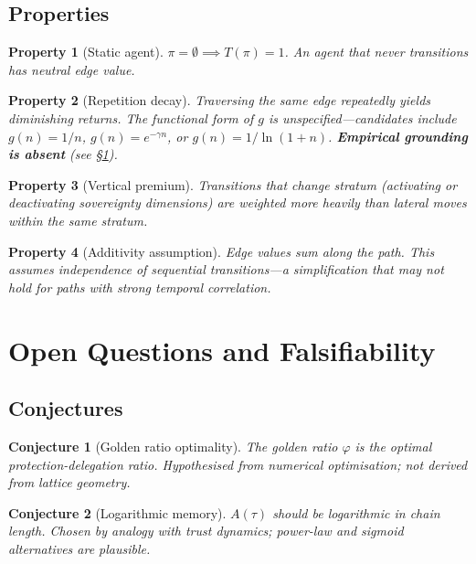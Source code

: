 \documentclass[11pt,a4paper]{article}
\newtheorem{property}{Property}[section]
\newtheorem{conjecture}{Conjecture}[section]
\begin{document}
\subsection{Properties}

\begin{property}[Static agent]
$\pi = \emptyset \implies T(\pi) = 1$. An agent that never transitions has neutral edge value.
\end{property}

\begin{property}[Repetition decay]
Traversing the same edge repeatedly yields diminishing returns. The functional form of $g$ is unspecified---candidates include $g(n) = 1/n$, $g(n) = e^{-\gamma n}$, or $g(n) = 1/\ln(1+n)$. \textbf{Empirical grounding is absent} (see \S\ref{sec:open}).
\end{property}

\begin{property}[Vertical premium]
Transitions that change stratum (activating or deactivating sovereignty dimensions) are weighted more heavily than lateral moves within the same stratum.
\end{property}

\begin{property}[Additivity assumption]
Edge values sum along the path. This assumes independence of sequential transitions---a simplification that may not hold for paths with strong temporal correlation.
\end{property}

\section{Open Questions and Falsifiability}
\label{sec:open}

\subsection{Conjectures}

\begin{conjecture}[Golden ratio optimality]\label{conj:phi}
The golden ratio $\varphi$ is the optimal protection-delegation ratio. Hypothesised from numerical optimisation; not derived from lattice geometry.
\end{conjecture}

\begin{conjecture}[Logarithmic memory]\label{conj:log}
$A(\tau)$ should be logarithmic in chain length. Chosen by analogy with trust dynamics; power-law and sigmoid alternatives are plausible.
\end{conjecture}
\end{document}
